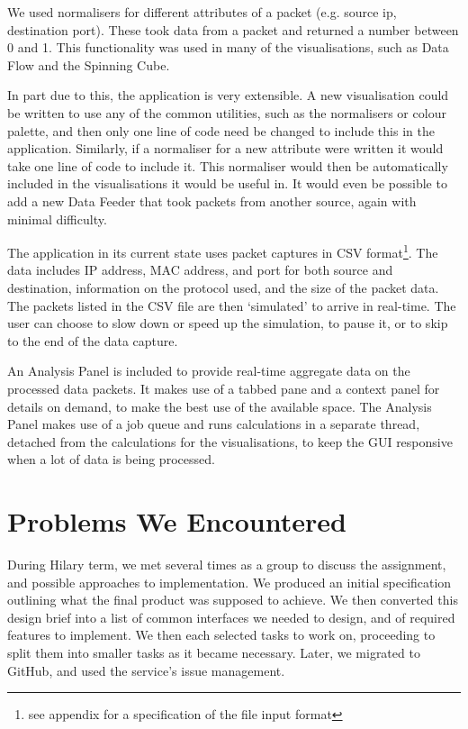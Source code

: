 \documentclass[12pt,a4paper]{article}
\begin{document}
			We used normalisers for different attributes of a packet (e.g. source ip, destination port).  These took data from a packet and returned a number between 0 and 1.  This functionality was used in many of the visualisations, such as Data Flow and the Spinning Cube.

			In part due to this, the application is very extensible.  A new visualisation could be written to use any of the common utilities, such as the normalisers or colour palette, and then only one line of code need be changed to include this in the application.  Similarly, if a normaliser for a new attribute were written it would take one line of code to include it.   This normaliser would then be automatically included in the visualisations it would be useful in.  It would even be possible to add a new Data Feeder that took packets from another source, again with minimal difficulty.
			
			The application in its current state uses packet captures in CSV format\footnote{see appendix for a specification of the file input format}. The data includes IP address, MAC address, and port for both source and destination,  information on the protocol used, and the size of the packet data. The packets listed in the CSV file are then `simulated' to arrive in real-time. The user can choose to slow down or speed up the simulation, to pause it, or to skip to the end of the data capture.
			
			An Analysis Panel is included to provide real-time aggregate data on the processed data packets. It makes use of a tabbed pane and a context panel for details on demand, to make the best use of the available space. The Analysis Panel makes use of a job queue and runs calculations in a separate thread, detached from the calculations for the visualisations, to keep the GUI responsive when a lot of data is being processed.

\clearpage

	\section*{Problems We Encountered}
        During Hilary term, we met several times as a group to discuss the assignment, and possible approaches to implementation. We produced an initial specification outlining what the final product was supposed to achieve. We then converted this design brief into a list of common interfaces we needed to design, and of required features to implement. We then each selected tasks to work on, proceeding to split them into smaller tasks as it became necessary. Later, we migrated to GitHub, and used the service's issue management.
		
\end{document}
